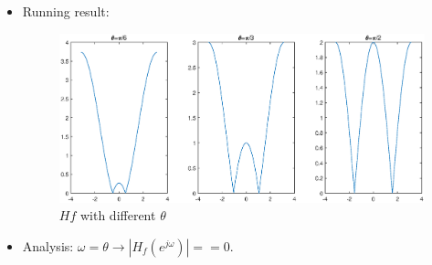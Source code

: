 \documentclass[onecolumn,oneside]{SUSTechHomework}
\begin{document}
\begin{itemize}
	\item Running result:
	\begin{figure}[H]
		\centering
		\includegraphics[width=170mm]{pictures/Hf.eps}
		\caption{$Hf$ with different $\theta$}
	\end{figure}
	\item Analysis: $\omega=\theta \rightarrow |H_f(e^{j\omega})|==0$.
\end{itemize}
\end{document}
